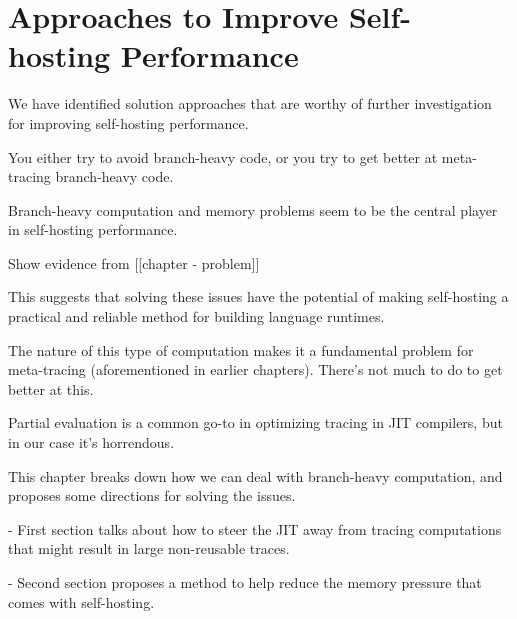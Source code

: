 \chapter{Approaches to Improve Self-hosting Performance}

	\label{chapter:solution}

    \begin{chaptersynopsis}
      We have identified solution approaches that are worthy of further investigation for improving self-hosting performance.

      You either try to avoid branch-heavy code, or you try to get better at meta-tracing branch-heavy code.
    \end{chaptersynopsis}

    \begin{paragraph-here}
      Branch-heavy computation and memory problems seem to be the central player in self-hosting performance.

      Show evidence from [[chapter - problem]]
    \end{paragraph-here}

    \begin{paragraph-here}
      This suggests that solving these issues have the potential of making self-hosting a practical and reliable method for building language runtimes.
    \end{paragraph-here}

    \begin{paragraph-here}
      The nature of this type of computation makes it a fundamental problem for meta-tracing (aforementioned in earlier chapters). There's not much to do to get better at this.
    \end{paragraph-here}

    \begin{paragraph-here}
      Partial evaluation is a common go-to in optimizing tracing in JIT compilers, but in our case it's horrendous.
    \end{paragraph-here}

    \begin{paragraph-here}
      This chapter breaks down how we can deal with branch-heavy computation, and proposes some directions for solving the issues.

        - First section talks about how to steer the JIT away from tracing computations that might result in large non-reusable traces.

        - Second section proposes a method to help reduce the memory pressure that comes with self-hosting.
    \end{paragraph-here}

